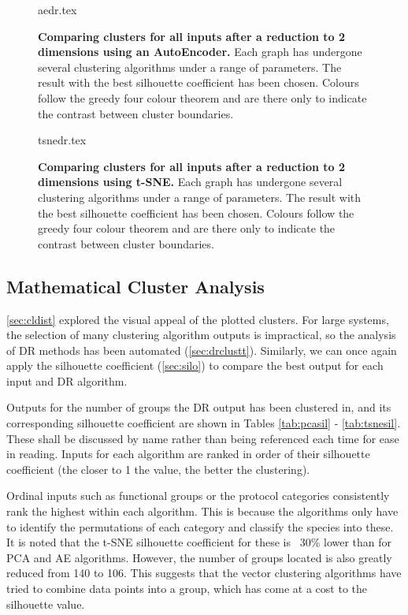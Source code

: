\begin{landscape}
\begin{figure}[H]
    {aedr.tex}
    \caption{\textbf{Comparing clusters for all inputs after a reduction to 2 dimensions using an AutoEncoder.}
    Each graph has undergone several clustering algorithms under a range of parameters. The result with the best silhouette coefficient has been chosen. Colours follow the greedy four colour theorem and are there only to indicate the contrast between cluster boundaries.}
    \label{fig:aevis}
\end{figure}
\end{landscape}


\begin{landscape}
\begin{figure}[H]
    {tsnedr.tex}
    \caption{\textbf{Comparing clusters for all inputs after a reduction to 2 dimensions using t-SNE.}
    Each graph has undergone several clustering algorithms under a range of parameters. The result with the best silhouette coefficient has been chosen. Colours follow the greedy four colour theorem and are there only to indicate the contrast between cluster boundaries.}
    \label{fig:tsnevis}
\end{figure}
\end{landscape}



\subsection{Mathematical Cluster Analysis}\label{sec:mathclustanalysis}

\autoref{sec:cldist} explored the visual appeal of the plotted clusters. For large systems, the selection of many clustering algorithm outputs is impractical, so the analysis of DR methods has been automated (\autoref{sec:drclustt}). Similarly, we can once again apply the silhouette coefficient (\autoref{sec:silo})
to compare the best output for each input and DR algorithm.

Outputs for the number of groups the DR output has been clustered in, and its corresponding silhouette coefficient are shown in Tables \ref{tab:pcasil} - \ref{tab:tsnesil}. These shall be discussed by name rather than being referenced each time for ease in reading.
Inputs for each algorithm are ranked in order of their silhouette coefficient (the closer to 1 the value, the better the clustering).

Ordinal inputs such as functional groups or the protocol categories consistently rank the highest within each algorithm. This is because the algorithms only have to identify the permutations of each category and classify the species into these. It is noted that the t-SNE silhouette coefficient for these is ~30\% lower than for PCA and AE algorithms. However, the number of groups located is also greatly reduced from 140 to 106. This suggests that the vector clustering algorithms have tried to combine data points into a group, which has come at a cost to the silhouette value.

